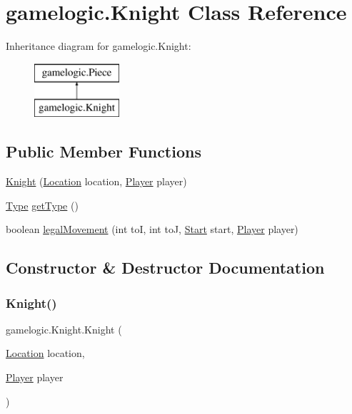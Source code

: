 \hypertarget{classgamelogic_1_1_knight}{}\section{gamelogic.\+Knight Class Reference}
\label{classgamelogic_1_1_knight}
Inheritance diagram for gamelogic.\+Knight\+:\begin{figure}[H]
\begin{center}
\leavevmode
\includegraphics[height=2.000000cm]{classgamelogic_1_1_knight}
\end{center}
\end{figure}
\subsection*{Public Member Functions}
\begin{DoxyCompactItemize}
\item 
\mbox{\hyperlink{classgamelogic_1_1_knight_a149e5fbffb36225d9ef068f6dbd73969}{Knight}} (\mbox{\hyperlink{classgamelogic_1_1_location}{Location}} location, \mbox{\hyperlink{classgamelogic_1_1_player}{Player}} player)
\item 
\mbox{\hyperlink{enumgamelogic_1_1_type}{Type}} \mbox{\hyperlink{classgamelogic_1_1_knight_a4f0d2e001a9cd1c0917677101f794d67}{get\+Type}} ()
\item 
boolean \mbox{\hyperlink{classgamelogic_1_1_knight_a4032e172c78addf1145765a8d53871b9}{legal\+Movement}} (int toI, int toJ, \mbox{\hyperlink{classgamelogic_1_1_start}{Start}} start, \mbox{\hyperlink{classgamelogic_1_1_player}{Player}} player)
\end{DoxyCompactItemize}


\subsection{Constructor \& Destructor Documentation}
\mbox{\label{classgamelogic_1_1_knight_a149e5fbffb36225d9ef068f6dbd73969}} 
\subsubsection{\texorpdfstring{Knight()}{Knight()}}
{\footnotesize\ttfamily gamelogic.\+Knight.\+Knight (\begin{DoxyParamCaption}\item[{\mbox{\hyperlink{classgamelogic_1_1_location}{Location}}}]{location,  }\item[{\mbox{\hyperlink{classgamelogic_1_1_player}{Player}}}]{player }\end{DoxyParamCaption})}


